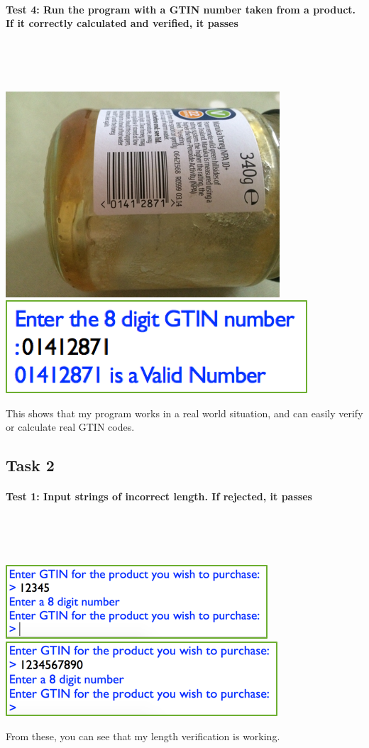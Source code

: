 \documentclass[a4paper]{article}
\begin{document}
\paragraph{Test 4: Run the program with a GTIN number taken from a product. If it correctly calculated and verified, it passes}~\par ~\par 
\noindent\includegraphics{testing_5.png} 
\noindent\includegraphics{testing_6.png} \par 
This shows that my program works in a real world situation, and can easily verify or calculate real GTIN codes.

\subsection{Task 2}	
\paragraph{Test 1: Input strings of incorrect length. If rejected, it passes} ~\par ~\par
\noindent\includegraphics{testing_7.png} 
\noindent\includegraphics{testing_8.png} \par 
From these, you can see that my length verification is working.
\end{document}
